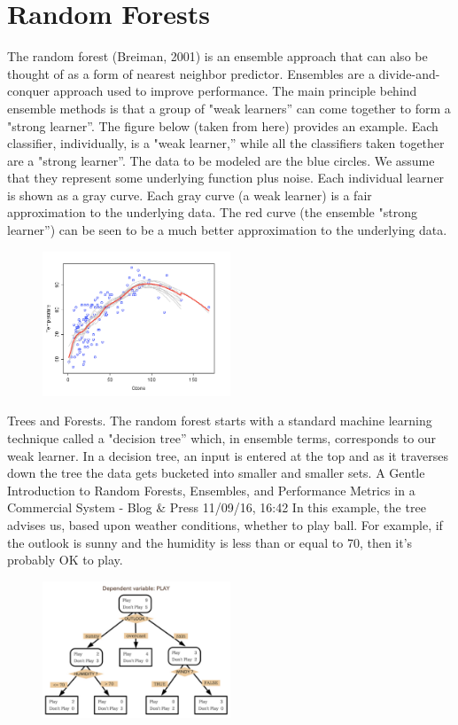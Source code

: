 \section{Random Forests}

The random forest (Breiman, 2001) is an ensemble approach that can also be thought of as a form of nearest neighbor predictor.
Ensembles are a divide-and-conquer approach used to improve performance. The main principle behind ensemble methods is that a group of "weak learners” can come together to form a "strong learner”. The figure below (taken from here) provides an example. Each classifier, individually, is a "weak learner,” while all the classifiers taken together are a "strong learner”.
The data to be modeled are the blue circles. We assume that they represent some underlying function plus noise. Each individual learner is shown as a gray curve. Each gray curve (a weak learner) is a fair approximation to the underlying data. The red curve (the ensemble "strong learner”) can be seen to be a much better approximation to the underlying data.

\begin{figure}
\centering
\includegraphics[width=0.5\textwidth]{img/rf_1.png}
\caption{}
\label{Fig.1}
\end{figure}

Trees and Forests. The random forest starts with a standard machine learning technique called a "decision tree” which, in ensemble terms, corresponds to our weak learner. In a decision tree, an input is entered at the top and as it traverses down the tree the data gets bucketed into smaller and smaller sets.
A Gentle Introduction to Random Forests, Ensembles, and Performance Metrics in a Commercial System - Blog \& Press 11/09/16, 16:42
In this example, the tree advises us, based upon weather conditions, whether to play ball. For example, if the outlook is sunny and the humidity is less than or equal to 70, then it’s probably OK to play.

\begin{figure}
\centering
\includegraphics[width=0.5\textwidth]{img/rf_2.jpg}
\caption{}
\label{Fig.1}
\end{figure}


